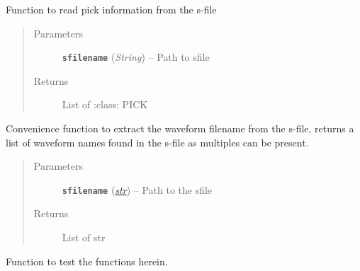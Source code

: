 \documentclass[a4paper,10pt,english]{sphinxmanual}
\begin{document}

\begin{fulllineitems}
\label{submodules/utils.Sfile_util:Sfile_util.readpicks}
Function to read pick information from the s-file
\begin{quote}\begin{description}
\item[{Parameters}] \leavevmode
\textbf{\texttt{sfilename}} (\emph{String}) -- Path to sfile

\item[{Returns}] \leavevmode
List of :class: PICK

\end{description}\end{quote}

\end{fulllineitems}


\begin{fulllineitems}
\label{submodules/utils.Sfile_util:Sfile_util.readwavename}
Convenience function to extract the waveform filename from the s-file,
returns a list of waveform names found in the s-file as multiples can
be present.
\begin{quote}\begin{description}
\item[{Parameters}] \leavevmode
\textbf{\texttt{sfilename}} (\href{https://docs.python.org/library/functions.html\#str}{\emph{str}}) -- Path to the sfile

\item[{Returns}] \leavevmode
List of str

\end{description}\end{quote}

\end{fulllineitems}


\begin{fulllineitems}
\label{submodules/utils.Sfile_util:Sfile_util.test_rw}
Function to test the functions herein.

\end{fulllineitems}
\end{document}
